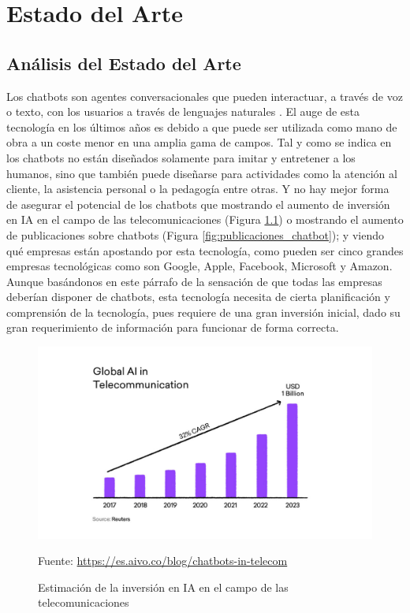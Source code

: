 \chapter{Estado del Arte}

\section{Análisis del Estado del Arte} \label{sec:analisis_estado_arte}

Los chatbots son agentes conversacionales que pueden interactuar, a través de voz o texto, con los usuarios a través de lenguajes naturales \cite{RefWorks:RefID:36-luo2022critical}. El auge de esta tecnología en los últimos años es debido a que puede ser utilizada como mano de obra a un coste menor en una amplia gama de campos. Tal y como se indica en \cite{RefWorks:RefID:37-adamopoulou2020overview} los chatbots no están diseñados solamente para imitar y entretener a los humanos, sino que también puede diseñarse para actividades como la atención al cliente, la asistencia personal o la pedagogía entre otras. Y no hay mejor forma de asegurar el potencial de los chatbots que mostrando el aumento de inversión en \gls{IA} en el campo de las telecomunicaciones (Figura \ref{fig:inversion_chatbot}) o mostrando el aumento de publicaciones sobre chatbots (Figura \ref{fig:publicaciones_chatbot}); y viendo qué empresas están apostando por esta tecnología, como pueden ser cinco grandes empresas tecnológicas como son Google, Apple, Facebook, Microsoft y Amazon. Aunque basándonos en este párrafo de la sensación de que todas las empresas deberían disponer de chatbots, esta tecnología necesita de cierta planificación y comprensión de la tecnología, pues requiere de una gran inversión inicial, dado su gran requerimiento de información para funcionar de forma correcta.

\begin{figure}[h]
\centering
\includegraphics[width=1.0\textwidth]{imagenes/02_EstadoDelArte/inversion_chatbots.jpg}
\begin{center}
Fuente: \url{https://es.aivo.co/blog/chatbots-in-telecom}
\end{center}
\caption{Estimación de la inversión en IA en el campo de las telecomunicaciones}
\label{fig:inversion_chatbot}
\end{figure}

